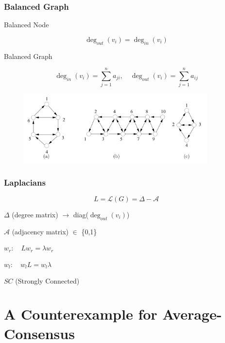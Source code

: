 \documentclass{beamer}
\begin{document}
\begin{frame}
    \frametitle{Balanced Graph}
    
        Balanced Node

        $$\deg_{out}(v_i) = \deg_{in}(v_i)$$

        Balanced Graph

        $$\deg_{in}(v_i) = \sum_{j=1}^{n}a_{ji},\quad \deg_{out}(v_i) = \sum_{j=1}^{n}a_{ij}$$

        \begin{figure}[htbp]
            \centering
            \includegraphics[width=10cm]{figures/Fig3-BalancedGraphs.jpeg}
            \label{BalancedGraphs}
        \end{figure}
    \end{frame}
\begin{frame}
\frametitle{Laplacians}

    $$L = \mathcal{L}(G) = \Delta-\mathcal{A}$$ %
    
    $\Delta$ (degree matrix) $\rightarrow$ diag($\deg_{out}(v_i)$) %
    
    $\mathcal{A}$ (adjacency matrix) $\in$ \{0,1\}

    $w_r: \quad L w_r = \lambda w_r$
    
    $w_l: \quad w_l L = w_l \lambda$

    $SC$ (Strongly Connected)

\end{frame}

\section{A Counterexample for Average-Consensus}
\end{document}
